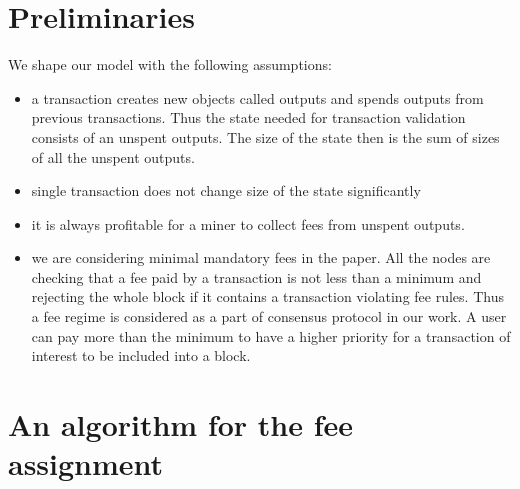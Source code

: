 \documentclass[]{llncs}   %
\begin{document}

\section{Preliminaries}
\label{sec:preliminaries}

We shape our model with the following assumptions:
\begin{itemize}%
  \item \label{a:utxo} a transaction creates new objects called outputs and spends outputs from previous transactions. Thus the state needed for transaction validation consists of an unspent outputs. The size of the state then is the sum of sizes of all the unspent outputs.
  \item \label{a:state} single transaction does not change size of the state significantly
  \item \label{a:miner} it is always profitable for a miner to collect fees from unspent outputs. 
  \item \label{a:minimal} we are considering minimal mandatory fees in the paper. All the nodes
      are checking that a fee paid by a transaction is not less than a minimum
      and rejecting the whole block if it contains a transaction violating fee
      rules. Thus a fee regime is considered as a part of consensus protocol in
      our work. A user can pay more than the minimum to have a higher priority
      for a transaction of interest to be included into a block.
\end{itemize}


\section{An algorithm for the fee assignment}
\label{sec:algorithm}
\end{document}
